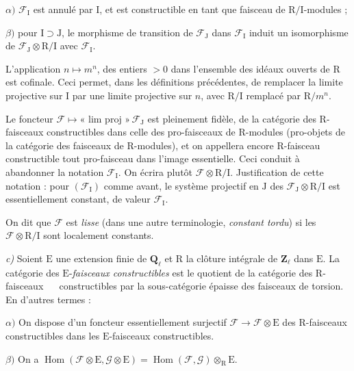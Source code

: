 \documentclass[11pt,leqno]{article}
\newcommand{\Page}[1]{\ifvmode\noindent\else\unskip\ \fi{\footnotesize\textcolor{gray}{[p.\,#1]}}\ \ignorespaces}
\begin{document}
\noindent \(\alpha)\) \(\mathscr{F}_{\mathrm{I}}\) est annulé par \(\mathrm{I}\), et est constructible en tant que faisceau de \(\mathrm{R}/\mathrm{I}\)-modules ;

\noindent \(\beta)\) pour \(\mathrm{I}\supset\mathrm{J}\), le morphisme de transition de \(\mathscr{F}_{\mathrm{J}}\) dans \(\mathscr{F}_{\mathrm{I}}\) induit un isomorphisme de \(\mathscr{F}_{\mathrm{J}}\otimes\mathrm{R}/\mathrm{I}\) avec \(\mathscr{F}_{\mathrm{I}}\).

L’application \(n\mapsto m^n\), des entiers \(>0\) dans l’ensemble des idéaux ouverts de \(\mathrm{R}\) est cofinale. Ceci permet, dans les définitions précédentes, de remplacer la limite projective sur \(\mathrm{I}\) par une limite projective sur \(n\), avec \(\mathrm{R}/\mathrm{I}\) remplacé par \(\mathrm{R}/m^n\).

Le foncteur \(\mathscr{F}\mapsto\text{« lim proj »}\,\mathscr{F}_{\mathrm{J}}\) est pleinement fidèle, de la catégorie des \(\mathrm{R}\)-faisceaux constructibles dans celle des pro-faisceaux de \(\mathrm{R}\)-modules (pro-objets de la catégorie des faisceaux de \(\mathrm{R}\)-modules), et on appellera encore \(\mathrm{R}\)-faisceau constructible tout pro-faisceau dans l’image essentielle. Ceci conduit à abandonner la notation \(\mathscr{F}_{\mathrm{I}}\). On écrira plutôt \(\mathscr{F}\otimes\mathrm{R}/\mathrm{I}\). Justification de cette notation : pour \((\mathscr{F}_{\mathrm{I}})\) comme avant, le système projectif en \(\mathrm{J}\) des \(\mathscr{F}_{\mathrm{J}}\otimes\mathrm{R}/\mathrm{I}\) est essentiellement constant, de valeur \(\mathscr{F}_{\mathrm{I}}\).

On dit que \(\mathscr{F}\) est \textit{lisse} (dans une autre terminologie, \textit{constant tordu}) si les \(\mathscr{F}\otimes\mathrm{R}/\mathrm{I}\) sont localement constants.

\textit{c)} Soient \(\mathrm{E}\) une extension finie de \(\mathbf{Q}_\ell\) et \(\mathrm{R}\) la clôture intégrale de \(\mathbf{Z}_\ell\) dans \(\mathrm{E}\). La catégorie des \(\mathrm{E}\)-\textit{faisceaux constructibles} est le quotient de la catégorie des \(\mathrm{R}\)-faisceaux \Page{147}
constructibles par la sous-catégorie épaisse des faisceaux de torsion. En d’autres termes :

\noindent \(\alpha)\) On dispose d’un foncteur essentiellement surjectif \(\mathscr{F}\to\mathscr{F}\otimes\mathrm{E}\) des \(\mathrm{R}\)-faisceaux constructibles dans les \(\mathrm{E}\)-faisceaux constructibles.

\noindent \(\beta)\) On a \(\operatorname{Hom}(\mathscr{F}\otimes\mathrm{E},\mathscr{G}\otimes\mathrm{E})=\operatorname{Hom}(\mathscr{F},\mathscr{G})\otimes_{\mathrm{R}}\mathrm{E}\).
\end{document}

